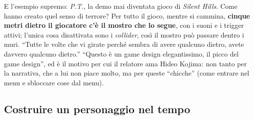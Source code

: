 E l'esempio supremo: \emph{P.T.}, la demo mai diventata gioco di
\emph{Silent Hills}. Come hanno creato quel senso di terrore? Per tutto il
gioco, mentre si cammina, \textbf{cinque metri dietro il giocatore c'è il
mostro che lo segue}, con i suoni e i trigger attivi; l'unica cosa disattivata
sono i \emph{collider}, così il mostro può passare dentro i muri. ``Tutte le
volte che vi girate perché sembra di avere qualcuno dietro, avete davvero
qualcuno dietro.'' ``Questo è un game design elegantissimo, il picco del game
design'', ed è il motivo per cui il relatore ama Hideo Kojima: non tanto per
la narrativa, che a lui non piace molto, ma per queste ``chicche'' (come
entrare nel menu e sbloccare cose dal menu).

\subsection{Costruire un personaggio nel tempo}

